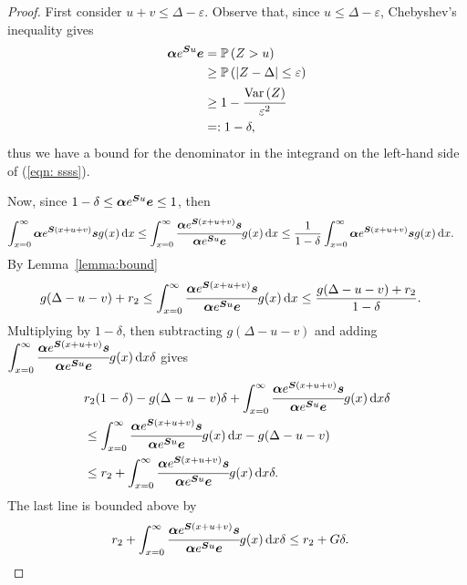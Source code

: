 \begin{proof}
	First consider \(u+v \leq \Delta - \varepsilon\). Observe that, since \(u\leq \Delta-\varepsilon\), Chebyshev's inequality gives
	\begin{align*}
		\boldsymbol \alpha e^{\boldsymbol Su}\boldsymbol e&=\mathbb P\left(Z >u\right) 
		\\&\geq \mathbb P\left(|Z -\Delta|\leq \varepsilon \right) 
		\\&\geq 1 - \cfrac{\mathrm{Var}\left(Z \right)}{\varepsilon ^2} 
		\\&=: 1-\delta ,
	\end{align*}
	thus we have a bound for the denominator in the integrand on the left-hand side of (\ref{eqn: ssss}).
	
	Now, since \(1-\delta\leq\boldsymbol \alpha e^{\boldsymbol Su}\boldsymbol e\leq 1\), then
	\begin{align*}
		\int_{x=0}^\infty \boldsymbol \alpha  e^{\boldsymbol{S} (x+u+v)} \boldsymbol s g(x)\, \mathrm{d} x
		\leq \int_{x=0}^\infty \cfrac{\boldsymbol \alpha  e^{\boldsymbol{S} (x+u+v)} \boldsymbol s}{\boldsymbol \alpha  e^{\boldsymbol{S} u} \boldsymbol e} g(x)\, \mathrm{d} x
		&\leq \frac{1}{1-\delta }\int_{x=0}^\infty \boldsymbol \alpha  e^{\boldsymbol{S} (x+u+v)} \boldsymbol s g(x)\, \mathrm{d} x.
	\end{align*}
	By Lemma~\ref{lemma:bound}  
	\begin{align*}
		g(\Delta-u-v)+r_2
		&\leq \int_{x=0}^\infty \cfrac{\boldsymbol \alpha  e^{\boldsymbol{S} (x+u+v)} \boldsymbol s}{\boldsymbol \alpha  e^{\boldsymbol{S} u} \boldsymbol e} g(x)\, \mathrm{d} x
		\leq \frac{g(\Delta-u-v)+r_2}{1-\delta }. 
	\end{align*}
	Multiplying by \(1-\delta \), then subtracting \(g(\Delta-u-v)\) and adding \(\displaystyle\int_{x=0}^\infty \cfrac{\boldsymbol \alpha  e^{\boldsymbol{S} (x+u+v)} \boldsymbol s}{\boldsymbol \alpha  e^{\boldsymbol{S} u} \boldsymbol e} g(x)\, \mathrm{d} x\delta \) gives
	\begin{align*}
		&r_2(1-\delta ) - g(\Delta-u-v)\delta +\int_{x=0}^\infty \cfrac{\boldsymbol \alpha  e^{\boldsymbol{S} (x+u+v)} \boldsymbol s}{\boldsymbol \alpha  e^{\boldsymbol{S} u} \boldsymbol e} g(x)\, \mathrm{d} x\delta 
		\\&\leq \int_{x=0}^\infty \cfrac{\boldsymbol \alpha  e^{\boldsymbol{S} (x+u+v)} \boldsymbol s}{\boldsymbol \alpha  e^{\boldsymbol{S} u} \boldsymbol e} g(x)\, \mathrm{d} x -g(\Delta-u-v)
		\\&\leq r_2+\int_{x=0}^\infty \cfrac{\boldsymbol \alpha  e^{\boldsymbol{S} (x+u+v)} \boldsymbol s}{\boldsymbol \alpha  e^{\boldsymbol{S} u} \boldsymbol e} g(x)\, \mathrm{d} x\delta .
	\end{align*}
	The last line is bounded above by 
	\begin{align*}
		r_2+\int_{x=0}^\infty \cfrac{\bs \alpha  e^{\bs{S} (x+u+v)} \bs s}{\bs \alpha  e^{\bs{S} u} \bs e} g(x)\wrt x\delta 
		&\leq r_2 + G \delta .

\end{align*}
\end{proof}
